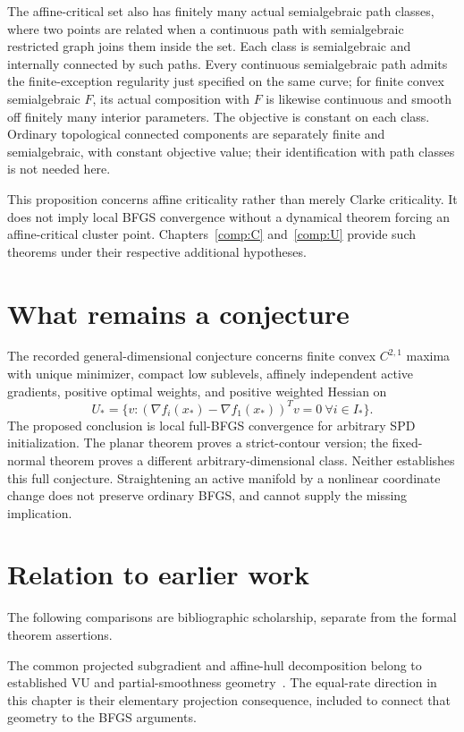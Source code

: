 The affine-critical set also has finitely many actual semialgebraic path classes, where two points are related when a continuous path with semialgebraic restricted graph joins them inside the set. Each class is semialgebraic and internally connected by such paths. Every continuous semialgebraic path admits the finite-exception regularity just specified on the same curve; for finite convex semialgebraic $F$, its actual composition with $F$ is likewise continuous and smooth off finitely many interior parameters. The objective is constant on each class. Ordinary topological connected components are separately finite and semialgebraic, with constant objective value; their identification with path classes is not needed here.

This proposition concerns affine criticality rather than merely Clarke criticality. It does not imply local BFGS convergence without a dynamical theorem forcing an affine-critical cluster point. Chapters~\ref{comp:C} and~\ref{comp:U} provide such theorems under their respective additional hypotheses.



\section{What remains a conjecture}
The recorded general-dimensional conjecture concerns finite convex $C^{2,1}$ maxima with unique minimizer, compact low sublevels, affinely independent active gradients, positive optimal weights, and positive weighted Hessian on
\[
 U_* =\{v:(\nabla f_i(x_*)-\nabla f_1(x_*))^Tv=0\ \forall i\in I_*\}.
\]
The proposed conclusion is local full-BFGS convergence for arbitrary SPD initialization. The planar theorem proves a strict-contour version; the fixed-normal theorem proves a different arbitrary-dimensional class. Neither establishes this full conjecture. Straightening an active manifold by a nonlinear coordinate change does not preserve ordinary BFGS, and cannot supply the missing implication.


\section*{Relation to earlier work}
The following comparisons are bibliographic scholarship, separate from the formal theorem assertions.

The common projected subgradient and affine-hull decomposition belong to established VU and partial-smoothness geometry~\cite{geom_Lewis2002,LL}. The equal-rate direction in this chapter is their elementary projection consequence, included to connect that geometry to the BFGS arguments.

